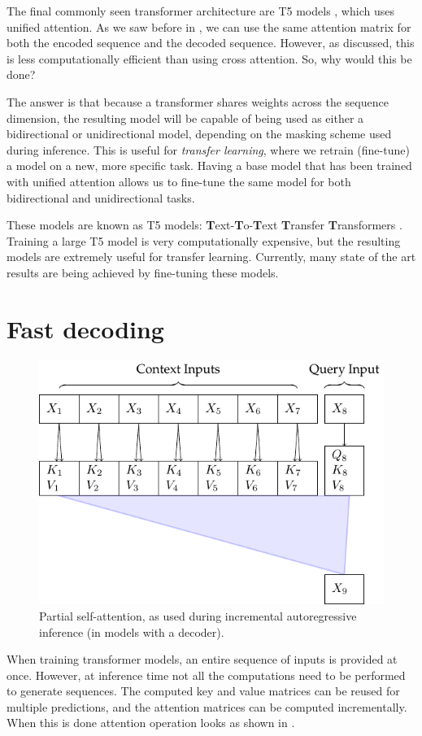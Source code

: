 The final commonly seen transformer architecture are T5 models \cite{t5}, which uses unified attention. As we saw before in , we can use the same attention matrix for both the encoded sequence and the decoded sequence. However, as discussed, this is less computationally efficient than using cross attention. So, why would this be done?

The answer is that because a transformer shares weights across the sequence dimension, the resulting model will be capable of being used as either a bidirectional or unidirectional model, depending on the masking scheme used during inference. This is useful for \textit{transfer learning}, where we retrain (fine-tune) a model on a new, more specific task. Having a base model that has been trained with unified attention allows us to fine-tune the same model for both bidirectional and unidirectional tasks.

These models are known as T5 models: \textbf{T}ext-\textbf{T}o-\textbf{T}ext \textbf{T}ransfer \textbf{T}ransformers \cite{t5}. Training a large T5 model is very computationally expensive, but the resulting models are extremely useful for transfer learning. Currently, many state of the art results are being achieved by fine-tuning these models.

\section{Fast decoding}
\label{sec:fast-decoding}

\begin{figure}
    \centering
    \includegraphics[]{figures/attn-4-partial.pdf}
    \caption[Partial self-attention]{Partial self-attention, as used during incremental autoregressive inference (in models with a decoder).}
    \label{fig:partial-self-attn}
\end{figure}

When training transformer models, an entire sequence of inputs is provided at once. However, at inference time not all the computations need to be performed to generate sequences. The computed key and value matrices can be reused for multiple predictions, and the attention matrices can be computed incrementally. When this is done attention operation looks as shown in .
